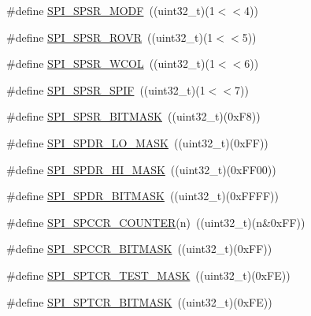 \begin{DoxyCompactItemize}
\item 
\#define \hyperlink{group___s_p_i___private___macros_ga96d682cc12df75a8993c4bc5af6313a2}{\-S\-P\-I\-\_\-\-S\-P\-S\-R\-\_\-\-M\-O\-D\-F}~((uint32\-\_\-t)(1$<$$<$4))
\item 
\#define \hyperlink{group___s_p_i___private___macros_gaf1751e5dd5a9ac89397a957d90f3e911}{\-S\-P\-I\-\_\-\-S\-P\-S\-R\-\_\-\-R\-O\-V\-R}~((uint32\-\_\-t)(1$<$$<$5))
\item 
\#define \hyperlink{group___s_p_i___private___macros_ga46ba3f4e139f22860081b48f8d19c91e}{\-S\-P\-I\-\_\-\-S\-P\-S\-R\-\_\-\-W\-C\-O\-L}~((uint32\-\_\-t)(1$<$$<$6))
\item 
\#define \hyperlink{group___s_p_i___private___macros_gad42ab0064435d5362a0fb61cfde34780}{\-S\-P\-I\-\_\-\-S\-P\-S\-R\-\_\-\-S\-P\-I\-F}~((uint32\-\_\-t)(1$<$$<$7))
\item 
\#define \hyperlink{group___s_p_i___private___macros_ga39bc3aec49ee674a8b0ef281c03ca395}{\-S\-P\-I\-\_\-\-S\-P\-S\-R\-\_\-\-B\-I\-T\-M\-A\-S\-K}~((uint32\-\_\-t)(0x\-F8))
\item 
\#define \hyperlink{group___s_p_i___private___macros_ga93c8aac945eab836a332ed8a9575c0a5}{\-S\-P\-I\-\_\-\-S\-P\-D\-R\-\_\-\-L\-O\-\_\-\-M\-A\-S\-K}~((uint32\-\_\-t)(0x\-F\-F))
\item 
\#define \hyperlink{group___s_p_i___private___macros_gad1d95ddc30067dbe7e74550ab7f65257}{\-S\-P\-I\-\_\-\-S\-P\-D\-R\-\_\-\-H\-I\-\_\-\-M\-A\-S\-K}~((uint32\-\_\-t)(0x\-F\-F00))
\item 
\#define \hyperlink{group___s_p_i___private___macros_ga45c6752c75a77a977d9bfaa34fe0e860}{\-S\-P\-I\-\_\-\-S\-P\-D\-R\-\_\-\-B\-I\-T\-M\-A\-S\-K}~((uint32\-\_\-t)(0x\-F\-F\-F\-F))
\item 
\#define \hyperlink{group___s_p_i___private___macros_gafba4aac7856191a72742ef400e824f78}{\-S\-P\-I\-\_\-\-S\-P\-C\-C\-R\-\_\-\-C\-O\-U\-N\-T\-E\-R}(n)~((uint32\-\_\-t)(n\&0x\-F\-F))
\item 
\#define \hyperlink{group___s_p_i___private___macros_ga2047f31dfc80c12c97b7bbe131fb9a9f}{\-S\-P\-I\-\_\-\-S\-P\-C\-C\-R\-\_\-\-B\-I\-T\-M\-A\-S\-K}~((uint32\-\_\-t)(0x\-F\-F))
\item 
\#define \hyperlink{group___s_p_i___private___macros_ga6f02d13c4ee894783260885bf54521ec}{\-S\-P\-I\-\_\-\-S\-P\-T\-C\-R\-\_\-\-T\-E\-S\-T\-\_\-\-M\-A\-S\-K}~((uint32\-\_\-t)(0x\-F\-E))
\item 
\#define \hyperlink{group___s_p_i___private___macros_gab6d2f457e42b28dafa60527e66cfa868}{\-S\-P\-I\-\_\-\-S\-P\-T\-C\-R\-\_\-\-B\-I\-T\-M\-A\-S\-K}~((uint32\-\_\-t)(0x\-F\-E))

\end{DoxyCompactItemize}
